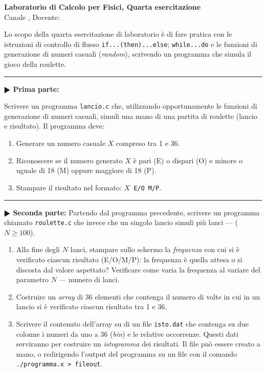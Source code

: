 \documentclass[11pt]{article}
\begin{document}
\pagestyle{empty}

\begin{center}
{\Large \bf  Laboratorio di Calcolo per Fisici, Quarta esercitazione\\[2mm]}
{\large Canale \canale, Docente: \docente}
\end{center}
\vspace{4mm}

\begin{mdframed}[backgroundcolor=panna]
  Lo scopo della quarta esercitazione di laboratorio \`e di fare pratica con
  le istruzioni di controllo di flusso \texttt{if...(then)...else}; \texttt{while...do} e le funzioni di generazione di numeri casuali ({\em random\/}), scrivendo un programma che simula il gioco della roulette.
  \end{mdframed}
%
%



\hrule
\vspace{2mm}
\textbf{$\RHD$ Prima parte:}

Scrivere un programma \texttt{lancio.c} che, utilizzando opportunamente le
funzioni di generazione di numeri casuali, simuli una mano di una partita di
roulette (lancio e risultato). Il programma deve:
\begin{enumerate}
\item Generare un numero casuale $X$ compreso tra 1 e 36.
\item Riconoscere se il numero generato $X$ \`e pari (E) o dispari (O) e minore
o uguale di 18 (M) oppure maggiore di 18 (P).
\item Stampare il risultato nel formato: \texttt{$X$ E/O M/P}.
\end{enumerate}

\hrule
\vspace{2mm}
\textbf{$\RHD$ Seconda parte:}
Partendo dal programma precedente, scrivere un programma chiamato \texttt{roulette.c} che
invece che un singolo lancio simuli pi\`u lanci ---  ($N \ge 100$).
\begin{enumerate}
\item Alla fine degli $N$ lanci, stampare sullo schermo la {\em frequenza\/}
con cui si \`e verificato ciascun risultato (E/O/M/P): la frequenza
\`e quella attesa o si discosta dal valore aspettato? Verificare come
varia la frequenza al variare del parametro $N$ --- numero di lanci.
\item Costruire un {\em array\/} di 36 elementi che contenga il numero di
volte in cui  in un lancio  si \`e verificato ciascun risultato tra 1 e 36.
\item Scrivere il contenuto dell'array su di un file
  \texttt{isto.dat} che contenga
su due colonne i numeri da uno a 36 ({\em bin\/}) e le relative occorrenze.
Questi dati serviranno per costruire un {\em istogramma\/} dei risultati.
Il file pu\`o essere creato a mano, o redirigendo l'output del programma
su un file con il comando \texttt{./programma.x > fileout}.
\end{enumerate}
\end{document}
